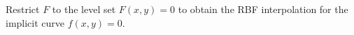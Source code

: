 Restrict $F$ to the level set $F(x, y) = 0$ to obtain the RBF interpolation for the implicit curve $f(x, y) = 0$.

\begin{solution}
    \ \\
    \vfill
\end{solution}